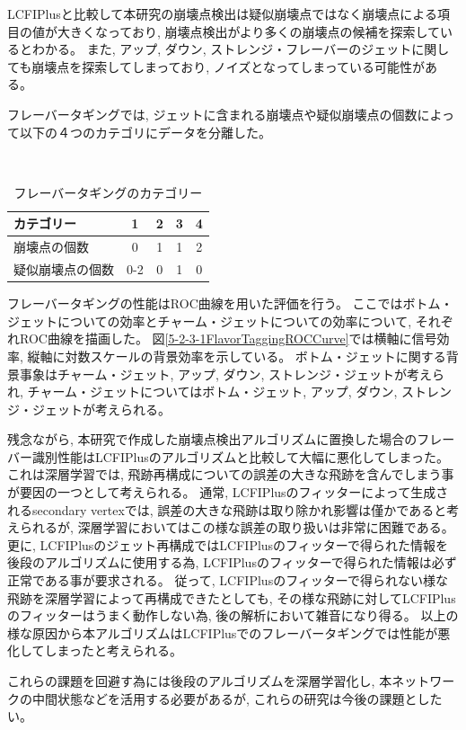 LCFIPlusと比較して本研究の崩壊点検出は疑似崩壊点ではなく崩壊点による項目の値が大きくなっており, 崩壊点検出がより多くの崩壊点の候補を探索しているとわかる。
また, アップ, ダウン, ストレンジ・フレーバーのジェットに関しても崩壊点を探索してしまっており, ノイズとなってしまっている可能性がある。

フレーバータギングでは, ジェットに含まれる崩壊点や疑似崩壊点の個数によって以下の$４$つのカテゴリにデータを分離した。

\begin{table}[htb]
 \centering
　\small
  \caption{フレーバータギングのカテゴリー}
  \begin{tabular}{l c c c c}\hline
    カテゴリー & 1 & 2 & 3 & 4\\\hline\hline
    崩壊点の個数 & 0 & 1 & 1 & 2\\
    疑似崩壊点の個数 & 0-2 & 0 & 1 & 0\\\hline
  \end{tabular}
  \label{TheNumberofReconstructedVertices}
\end{table}

フレーバータギングの性能はROC曲線を用いた評価を行う。
ここではボトム・ジェットについての効率とチャーム・ジェットについての効率について, それぞれROC曲線を描画した。
図\ref{5-2-3-1FlavorTaggingROCCurve}では横軸に信号効率, 縦軸に対数スケールの背景効率を示している。
ボトム・ジェットに関する背景事象はチャーム・ジェット, アップ, ダウン, ストレンジ・ジェットが考えられ, チャーム・ジェットについてはボトム・ジェット, アップ, ダウン, ストレンジ・ジェットが考えられる。

残念ながら, 本研究で作成した崩壊点検出アルゴリズムに置換した場合のフレーバー識別性能はLCFIPlusのアルゴリズムと比較して大幅に悪化してしまった。
これは深層学習では, 飛跡再構成についての誤差の大きな飛跡を含んでしまう事が要因の一つとして考えられる。
通常, LCFIPlusのフィッターによって生成されるsecondary vertexでは, 誤差の大きな飛跡は取り除かれ影響は僅かであると考えられるが, 深層学習においてはこの様な誤差の取り扱いは非常に困難である。
更に, LCFIPlusのジェット再構成ではLCFIPlusのフィッターで得られた情報を後段のアルゴリズムに使用する為, LCFIPlusのフィッターで得られた情報は必ず正常である事が要求される。
従って, LCFIPlusのフィッターで得られない様な飛跡を深層学習によって再構成できたとしても, その様な飛跡に対してLCFIPlusのフィッターはうまく動作しない為, 後の解析において雑音になり得る。
以上の様な原因から本アルゴリズムはLCFIPlusでのフレーバータギングでは性能が悪化してしまったと考えられる。

これらの課題を回避す為には後段のアルゴリズムを深層学習化し, 本ネットワークの中間状態などを活用する必要があるが, これらの研究は今後の課題としたい。

